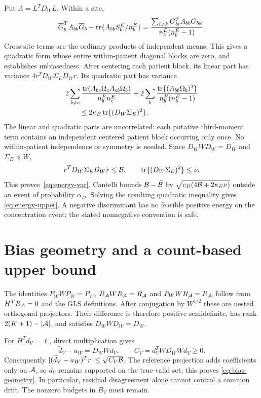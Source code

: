 Put $A=L^TD_WL$. Within a site,
\[
 \overline G_b^TA_{bb}\overline G_b-
 \operatorname{tr}\{A_{bb}S_b^E/n_b^E\}
 =\frac{\sum_{i\ne k}G_{bi}^TA_{bb}G_{bk}}{n_b^E(n_b^E-1)}.
\]
Cross-site terms are the ordinary products of independent means. This gives
a quadratic form whose entire within-patient diagonal blocks are zero, and
establishes unbiasedness. After centering each patient block, its linear
part has variance $4r^TD_W\Sigma_ED_Wr$. Its quadratic part has variance
\begin{align*}
 &2\sum_{b\ne c}\frac{\operatorname{tr}(A_{bc}\Omega_cA_{cb}\Omega_b)}{n_b^En_c^E}
 +2\sum_b\frac{\operatorname{tr}\{(A_{bb}\Omega_b)^2\}}{n_b^E(n_b^E-1)}\\
 &\hspace{2em}\le2\kappa_E\operatorname{tr}\{(D_W\Sigma_E)^2\}.
\end{align*}
The linear and quadratic parts are uncorrelated: each putative third-moment
term contains an independent centered patient block occurring only once.
No within-patient independence or symmetry is needed. Since
$D_WWD_W=D_W$ and $\Sigma_E\preceq W$,
\[
 r^TD_W\Sigma_ED_Wr\le\mathcal B,
 \qquad \operatorname{tr}\{(D_W\Sigma_E)^2\}\le\nu.
\]
This proves~\eqref{eq:energy-var}. Cantelli bounds
$\mathcal B-\widehat{\mathcal B}$ by
$\sqrt{c_D(4\mathcal B+2\kappa_E\nu)}$ outside an event of probability
$\alpha_D$. Solving the resulting quadratic inequality gives
\eqref{eq:energy-upper}. A negative discriminant has no feasible positive
energy on the concentration event; the stated nonnegative convention is safe.

\section{Bias geometry and a count-based upper bound}\label{app:count-bound}

The identities $P_WWP_W=P_W$, $R_{\mathcal A}WR_{\mathcal A}=R_{\mathcal A}$ and
$P_WWR_{\mathcal A}=R_{\mathcal A}$ follow from $H^TR_{\mathcal A}=0$ and the GLS definitions.
After conjugation by $W^{1/2}$ these are nested orthogonal projectors.
Their difference is therefore positive semidefinite, has rank
$2(K+1)-|\mathcal A|$, and satisfies $D_WWD_W=D_W$.

For $H^Td_V=\ell$, direct multiplication gives
\[
 \widetilde d_V-a_W=D_WWd_V,\qquad
 C_V=d_V^TWD_WWd_V\ge0.
\]
Consequently $|(\widetilde d_V-a_W)^Tr|\le\sqrt{C_V\mathcal B}$.
The reference projection adds coefficients only on $\mathcal A$, so
$\widetilde d_V$ remains supported on the true valid set; this proves
\eqref{eq:bias-geometry}. In particular, residual disagreement alone cannot
control a common drift. The nonzero budgets in $B_V$ must remain.

